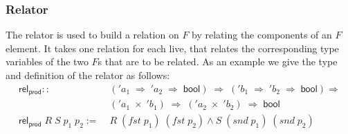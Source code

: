       \subsubsection{Relator}
        The relator is used to build a relation on $F$ by relating the components of an $F$ element. It takes one relation for each live, that relates the corresponding type variables of the two $F$s that are to be related. As an example we give the type and definition of the relator as follows:
        \begin{align*}
          \textsf{rel}_\textsf{prod} ::\; &('a_1\; \Rightarrow\; 'a_2\; \Rightarrow\; \textsf{bool})\; \Rightarrow\; ('b_1\; \Rightarrow\; 'b_2\; \Rightarrow\; \textsf{bool})\Rightarrow\\
            &('a_1\; \times\; 'b_1)\; \Rightarrow\; ('a_2\; \times\; 'b_2)\; \Rightarrow\; \textsf{bool}\\
          \textsf{rel}_\textsf{prod}\; R\; S\; p_1\; p_2 :=\; & R\; (fst\; p_1)\; (fst\; p_2)\land S\; (snd\; p_1)\; (snd\; p_2)
        \end{align*}


